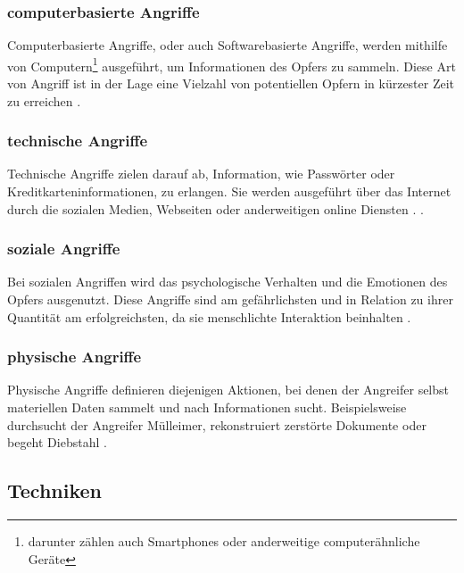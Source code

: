 \subsubsection{computerbasierte Angriffe}
Computerbasierte Angriffe, oder auch Softwarebasierte Angriffe, werden mithilfe von Computern\footnote{darunter zählen auch Smartphones oder anderweitige computerähnliche Geräte}
ausgeführt, um Informationen des Opfers zu sammeln. Diese Art von Angriff ist in der Lage eine Vielzahl
von potentiellen Opfern in kürzester Zeit zu erreichen .

\subsubsection{technische Angriffe}
Technische Angriffe zielen darauf ab, Information, wie Passwörter oder Kreditkarteninformationen, zu erlangen. Sie werden ausgeführt über das Internet durch die sozialen Medien,
Webseiten oder anderweitigen online Diensten . .

\subsubsection{soziale Angriffe}
Bei sozialen Angriffen wird das psychologische Verhalten und die Emotionen des Opfers ausgenutzt. Diese Angriffe sind am gefährlichsten und in Relation zu ihrer Quantität am
erfolgreichsten, da sie menschlichte Interaktion beinhalten .

\subsubsection{physische Angriffe}
Physische Angriffe definieren diejenigen Aktionen, bei denen der Angreifer selbst materiellen Daten sammelt und nach Informationen sucht.
Beispielsweise durchsucht der Angreifer Mülleimer,
rekonstruiert zerstörte Dokumente oder begeht Diebstahl .

\subsection{Techniken}

